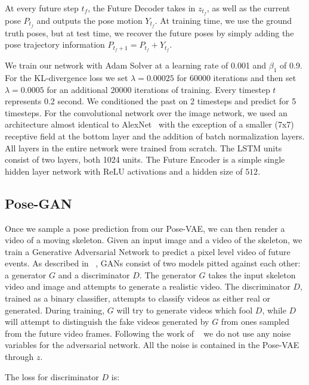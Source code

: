 At every future step $t_f$, the Future Decoder takes in $z_{t_f}$, as well as the current pose $P_{t_f}$ and outputs the pose motion $Y_{t_f}$. At training time, we use the ground truth poses, but at test time, we recover the future poses by simply adding the pose trajectory information $P_{t_f+1}=P_{t_f}+Y_{t_f}$. 

 We train our network with Adam Solver at a learning rate of 0.001 and $\beta_{1}$ of 0.9. For the KL-divergence loss we set $\lambda=0.00025$ for 60000 iterations and then set $\lambda=0.0005$ for an additional 20000 iterations of training. Every timestep $t$ represents 0.2 second. We conditioned the past on 2 timesteps and predict for 5 timesteps. For the convolutional network over the image network, we used an architecture almost identical to AlexNet~\cite{Krizhevsky12} with the exception of a smaller (7x7) receptive field at the bottom layer and the addition of batch normalization layers. All layers in the entire network were trained from scratch. The LSTM units consist of two layers, both 1024 units. The Future Encoder is a simple single hidden layer network with ReLU activations and a hidden size of $512$. 



\subsection{Pose-GAN}

 Once we sample a pose prediction from our Pose-VAE, we can then render a video of a moving skeleton. Given an input image and a
video of the skeleton, we train a Generative Adversarial Network to predict a pixel level video of future events. As described in ~\cite{Wang16}, GANs consist of two models pitted against each other: a generator $G$ and a discriminator $D$. The generator $G$ takes the input skeleton video and image and attempts to generate a realistic video. The discriminator $D$, trained as a binary classifier, attempts to classify videos as either real or generated. During training, $G$ will try to generate videos which fool $D$, while $D$ will attempt to distinguish the fake videos generated by $G$ from ones sampled from the future video frames.
Following the work of ~\cite{Isola16, Vondrick16} we do not use any noise variables for the adversarial network. All the noise is contained in the Pose-VAE through $z$.


The loss for discriminator $D$ is:

